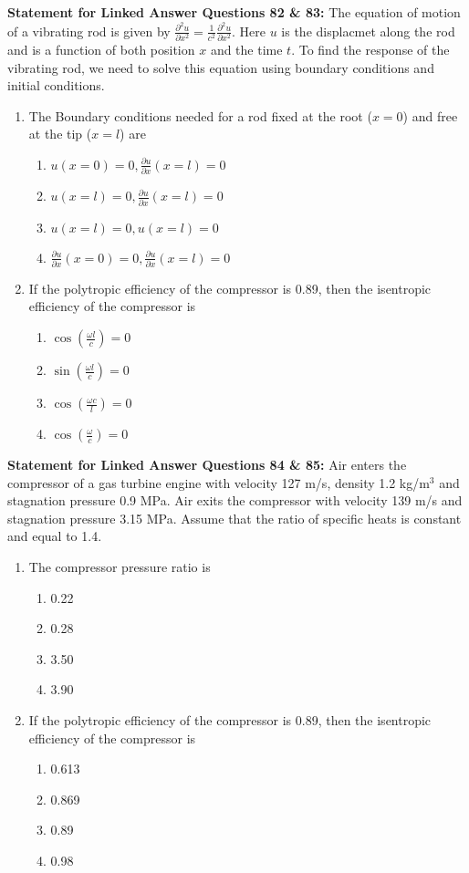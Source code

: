 \documentclass[journal]{IEEEtran}
\begin{document}
\textbf{Statement for Linked Answer Questions 82 \& 83: }The equation of motion of a vibrating rod is given by $\frac{\partial^2u}{\partial x^2} = \frac{1}{c^2}\frac{\partial^2u}{\partial x^2}$. Here $u$ is the displacmet along the rod and is a function of both position $x$ and the time $t$. To find the response of the vibrating rod, we need to solve this equation using boundary conditions and initial conditions.

\begin{enumerate}
    \item The Boundary conditions needed for a rod fixed at the root ($x=0$) and free at the tip ($x=l$) are
  \begin{enumerate}
      \item $u(x=0)=0,\frac{\partial u}{\partial x}(x=l)=0$
      \item $u(x=l)=0,\frac{\partial u}{\partial x}(x=l)=0$
    \item $u(x=l)=0,u(x=l)=0$
    \item $\frac{\partial u}{\partial x}(x=0)=0, \frac{\partial u}{\partial x}(x=l)=0$
  \end{enumerate}
  \item If the polytropic efficiency of the compressor is 0.89, then the isentropic efficiency of the compressor is
  \begin{enumerate}
      \item $\cos(\frac{\omega l}{c})=0$
      \item $\sin (\frac{\omega l}{c})=0$
      \item $\cos (\frac{\omega c}{l})=0$
      \item $\cos (\frac{\omega}{c})=0$
  \end{enumerate}
\end{enumerate}



\textbf{Statement for Linked Answer Questions 84 \& 85:} Air enters the compressor of a gas turbine engine with velocity 127 m/s, density 1.2 kg/m$^3$ and stagnation pressure 0.9 MPa. Air exits the compressor with velocity 139 m/s and stagnation pressure 3.15 MPa. Assume that the ratio of specific heats is constant and equal to 1.4.
\begin{enumerate}
  \item The compressor pressure ratio is
  \begin{enumerate}
    \item 0.22
    \item 0.28
    \item 3.50
    \item 3.90
  \end{enumerate}
  \item If the polytropic efficiency of the compressor is 0.89, then the isentropic efficiency of the compressor is
  \begin{enumerate}
    \item 0.613
    \item 0.869
    \item 0.89
    \item 0.98
  \end{enumerate}
\end{enumerate}
\end{document}
